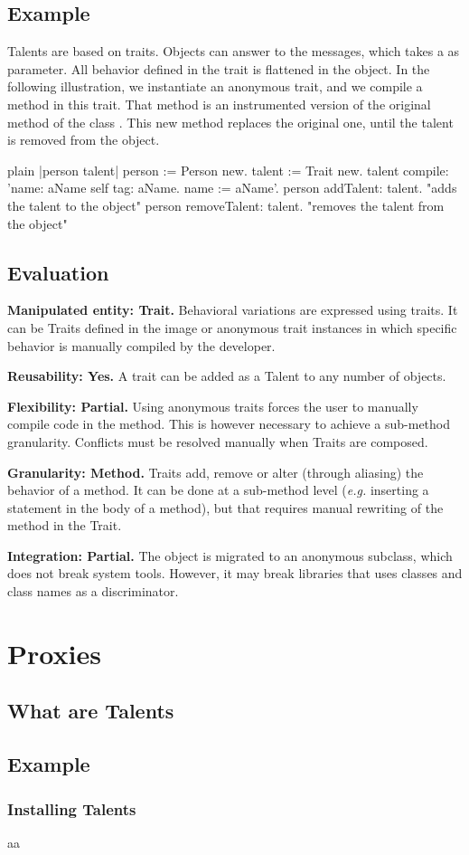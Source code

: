\documentclass[10pt,twoside,english]{_support/latex/sbabook/sbabook}
\begin{document}
\section{Example}
Talents are based on traits. Objects can answer to the  messages, which takes a  as parameter. All behavior defined in the trait is flattened in the object. In the following illustration, we instantiate an anonymous trait, and we compile a method in this trait. That method is an instrumented version of the original  method of the class . This new method replaces the original one, until the talent is removed from the object.

\begin{displaycode}{plain}
|person talent|
  person := Person new.
	talent := Trait new.
	talent
		compile:
			'name: aName
	       self tag: aName.
	       name := aName'.
	person addTalent: talent. "adds the talent to the object"
  person removeTalent: talent. "removes the talent from the object"
\end{displaycode}
\section{Evaluation}
\textbf{Manipulated entity: Trait.} Behavioral variations are expressed using traits. It can be Traits defined in the image or anonymous trait instances in which specific behavior is manually compiled by the developer.

\textbf{Reusability: Yes.} A trait can be added as a Talent to any number of objects.

\textbf{Flexibility: Partial.} Using anonymous traits forces the user to manually compile code in the method. This is however necessary to achieve a sub-method granularity. Conflicts must be resolved manually when Traits are composed.

\textbf{Granularity: Method.} Traits add, remove or alter (through aliasing) the behavior of a method. It can be done at a sub-method level (\textit{e.g.} inserting a statement in the body of a method), but that requires manual rewriting of the method in the Trait.

\textbf{Integration: Partial.} The object is migrated to an anonymous subclass, which does not break system tools. However, it may break libraries that uses classes and class names as a discriminator.

\chapter{Proxies}\section{What are Talents}\section{Example}\subsection{Installing Talents}
aa
\end{document}
